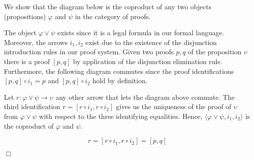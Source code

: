 We show that the diagram below is the coproduct of any two objects (propositions) $φ$ and $ψ$ in the category of proofs.


The object $φ ∨ ψ$ exists since it is a legal formula in our formal language. Moreover, the arrows $i_1, i_2$ exist due to the existence of the disjunction introduction rules in our proof system. Given two proofs $p, q$ of the proposition $υ$ there is a proof $[p,q]$ by application of the disjunction elimination rule. Furthermore, the following diagram commutes since the proof identifications $[p,q] ∘ i_1 = p$ and $[p,q] ∘ i_2$ hold by definition.


Let $r : φ ∨ ψ → υ$ any other arrow that lets the diagram above commute. The third identification $r = [r ∘ i_1,r ∘ i_2]$ gives us the uniqueness of the proof of $υ$ from $φ ∨ ψ$ with respect to the three identifying equalities. Hence, $⟨φ ∨ ψ,i_1,i_2⟩$ is the coproduct of $φ$ and $ψ$.

$$r = [r ∘ i_1,r ∘ i_2] = [p,q]$$

\hfill $\Box$
